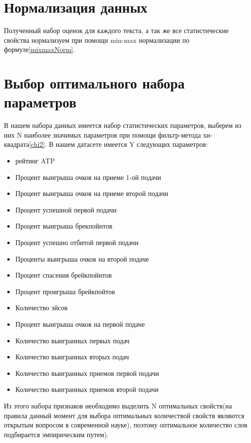\section{Нормализация данных}
Полученный набор оценок для каждого текста, а так же все статистические свойства нормализуем при помощи min-max нормализации по формуле\ref{mixmaxNorm}.
\section{Выбор оптимального набора параметров}
В нашем набора данных имеется набор статистических параметров, выберем из них N наиболее значимых параметров при помощи фильтр-метода хи-квадрата\ref{chi2}.
В нашем датасете имеется Y следующих параметров:
\begin{itemize}
	\item рейтинг ATP
	\item Процент выигрыша очков на приеме 1-ой подачи
	\item Процент выигрыша очков на приеме второй подачи
	\item Процент успешной первой подачи
	\item Процент выигрыша брекпойнтов
	\item Процент успешно отбитой первой подачи
	\item Проценты выигрыша очков на второй подаче
	\item Процент спасения брейкпойнтов
	\item Процент проигрыша брейкпойтов
	\item Количество эйсов
	\item Процент выигрыша очков на первой подаче
	\item Количество выигранных первых подач
	\item Количество выигранных вторых подач
	\item Количество выигранных приемов первой подачи
	\item Количество выигранных приемов второй подачи
\end{itemize}

Из этого набора признаков необходимо выделить N оптимальных свойств(на правила данный момент для выбора оптимальных количествой свойств являются открытым вопросом в современной науке\cite{Book32}), поэтому оптимальное количество слов подбирается эмпирическим путем).
